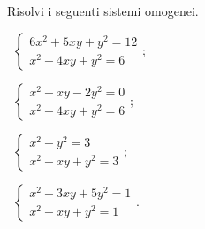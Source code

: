 \begin{esercizio}[\Ast]
\label{ese:6.52}
Risolvi i seguenti sistemi omogenei.
\begin{multicols}{2}
 \begin{enumeratea}
 \item~$\left\{\begin{array}{l}6x^2+5xy+y^2=12\\x^2+4xy+y^2=6\end{array}\right.$;
 \item~$\left\{\begin{array}{l}x^2-xy-2y^2=0\\x^2-4xy+y^2=6\end{array}\right.$;
 \item~$\left\{\begin{array}{l}x^2+y^2=3\\x^2-xy+y^2=3\end{array}\right.$;
 \item~$\left\{\begin{array}{l}x^2-3xy+5y^2=1\\x^2+xy+y^2=1\end{array}\right.$.
 \end{enumeratea}
\end{multicols}
\end{esercizio}

